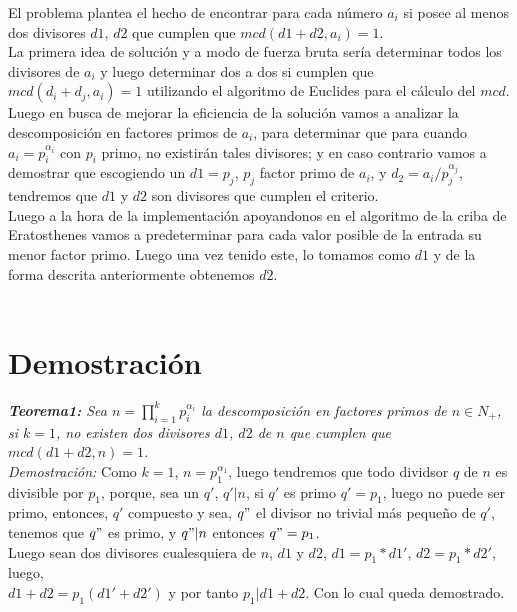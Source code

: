 \documentclass[12pt]{article}
\begin{document}
El problema plantea el hecho de encontrar para cada n\'umero $a_i$ si posee al menos dos divisores $d1$, $d2$ que cumplen que 
$mcd(d1+d2, a_i)=1$.\\
La primera idea de soluci\'on y a modo de fuerza bruta ser\'ia determinar todos los divisores de $a_i$ y luego determinar dos a dos si cumplen
 que $mcd(d_i+d_j,a_i)=1$ utilizando el algoritmo de Euclides para el c\'alculo del $mcd$.\\
Luego en busca de mejorar la eficiencia de la soluci\'on vamos a analizar la descomposici\'on en factores primos de $a_i$, para determinar que 
para cuando $a_i=p_i^{\alpha_i}$ con $p_i$ primo, no existir\'an tales divisores; y en caso contrario vamos a demostrar que escogiendo un 
$d1=p_j$, $p_j$ factor primo de $a_i$, y $d_2=a_i/p_{j}^{\alpha_j}$, tendremos que $d1$ y $d2$ son divisores que cumplen el criterio.\\
Luego a la hora de la implementaci\'on apoyandonos en el algoritmo de la criba de Eratosthenes vamos a predeterminar para cada valor posible 
de la entrada su menor factor primo. Luego una vez tenido este, lo tomamos como $d1$ y de la forma descrita anteriormente obtenemos $d2$.\\
\\


\section{Demostración}

\textit{\textbf{Teorema1:} Sea $n = \prod\limits_{i=1}^{k} p_{i}^{\alpha_i}$ la descomposici\'on en factores primos de $n\in N_+$,
 si $k=1$, no existen dos divisores $d1$, $d2$ de $n$ que cumplen que $mcd(d1+d2,n)=1$.}\\
\textit{Demostraci\'on:} Como $k = 1$, $n = p_{1}^{\alpha_1}$, luego tendremos que todo dividsor $q$ de $n$ es divisible por $p_1$, porque, 
sea un $q'$, $q'| n$, si $q'$ es primo $q'=p_1$, luego no puede ser primo, entonces, $q'$ compuesto y sea, 
$q"$ el divisor no trivial m\'as peque\~no de $q'$, tenemos que $q"$ es primo, y $q"|n$ entonces $q"=p_1$.\\
Luego sean dos divisores cualesquiera de $n$, $d1$ y $d2$, $d1=p_1*d1'$, $d2=p_1*d2'$, luego,\\
 $d1+d2=p_1(d1'+d2')$ y por tanto 
$p_1| d1+d2$. Con lo cual queda demostrado.      
\end{document}
